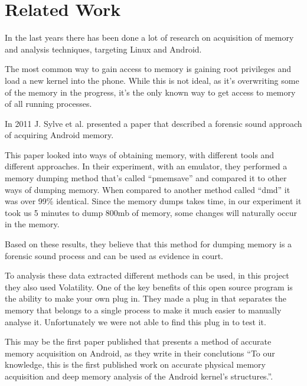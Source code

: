 \section{Related Work}
In the last years there has been done a lot of research on acquisition of memory and analysis
techniques, targeting Linux and Android.

The most common way to gain access to memory is gaining root privileges and load a new kernel into
the phone. While this is not ideal, as it’s overwriting some of the memory in the progress, it’s the
only known way to get access to memory of all running processes.

In 2011 J. Sylve et al. presented a paper that described a forensic sound approach of acquiring
Android memory. \cite{acq_vol_android_mem}

This paper looked into ways of obtaining memory, with different tools and different approaches. In
their experiment, with an emulator, they performed a memory dumping method that’s called
“pmemsave” and compared it to other ways of dumping memory. When compared to another
method called “dmd” it was over 99\% identical. Since the memory dumps takes time, in our
experiment it took us 5 minutes to dump 800mb of memory, some changes will naturally occur in the
memory.

Based on these results, they believe that this method for dumping memory is a forensic sound
process and can be used as evidence in court.

To analysis these data extracted different methods can be used, in this project they also used
Volatility. One of the key benefits of this open source program is the ability to make your own plug
in. They made a plug in that separates the memory that belongs to a single process to make it much
easier to manually analyse it. Unfortunately we were not able to find this plug in to test it.

This may be the first paper published that presents a method of accurate memory acquisition on
Android, as they write in their conclutions “To our knowledge, this is the first published work on
accurate physical memory acquisition and deep memory analysis of the Android kernel’s structures.”.
